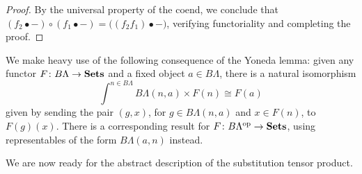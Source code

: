 \begin{proof}
By the universal property of the coend, we conclude that $(f_2 \bullet -) \circ (f_1 \bullet -) = \big( (f_2f_1) \bullet -\big)$, verifying functoriality and completing the proof.
\end{proof}

\begin{rem}\label{rem:yoneda-coend}
We make heavy use of the following consequence of the Yoneda lemma: given any functor $F \colon B\Lambda \rightarrow \mathbf{Sets}$ and a fixed object $a \in B\Lambda$, there is a natural isomorphism
  \[
    \int^{n \in B\Lambda} B\Lambda(n,a) \times F(n) \cong F(a)
  \]
given by sending the pair $(g, x)$, for $g \in B\Lambda(n,a)$ and $x \in F(n)$, to $F(g)(x)$.
There is a corresponding result for $F \colon B\Lambda^{\textrm{op}} \rightarrow \mathbf{Sets}$, using representables of the form $B\Lambda(a,n)$ instead.
\end{rem}


We are now ready for the abstract description of the substitution tensor product.

